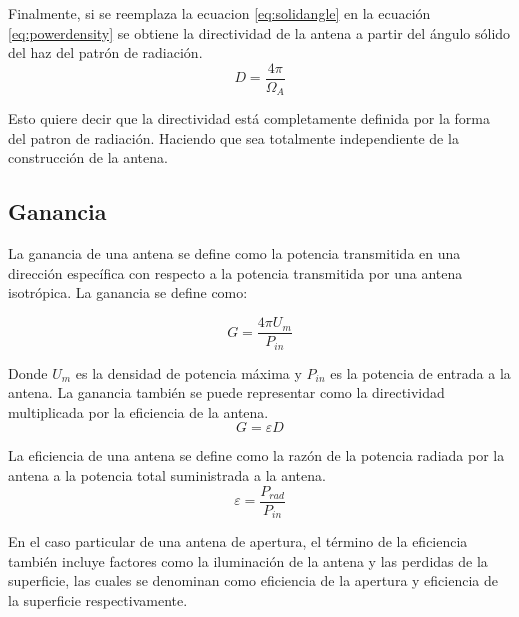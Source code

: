Finalmente, si se reemplaza la ecuacion \ref{eq:solidangle} en la ecuación \ref{eq:powerdensity} se obtiene la directividad de la antena a partir del ángulo sólido del haz del patrón de radiación.\\

\begin{equation}
    D = \frac{4\pi}{\Omega_{A}}
\end{equation}

Esto quiere decir que la directividad está completamente definida por la forma del patron de radiación. Haciendo que sea totalmente independiente de la construcción de la antena\cite{stutzman2012antenna}.\\


\subsection{Ganancia}

La ganancia de una antena se define como la potencia transmitida en una dirección específica con respecto a la potencia transmitida por una antena isotrópica. La ganancia se define como:

\begin{equation}
    G = \frac{4\pi U_{m}}{P_{in}}
\end{equation}

Donde $U_{m}$ es la densidad de potencia máxima y $P_{in}$ es la potencia de entrada a la antena. La ganancia también se puede representar como la directividad multiplicada por la eficiencia de la antena.\\

\begin{equation}
    G = \varepsilon D 
\end{equation}

La eficiencia de una antena se define como la razón de la potencia radiada por la antena a la potencia total suministrada a la antena.\\

\begin{equation}
    \varepsilon = \frac{P_{rad}}{P_{in}}
\end{equation}

En el caso particular de una antena de apertura, el término de la eficiencia también incluye factores como la iluminación de la antena y las perdidas de la superficie, las cuales se denominan como eficiencia de la apertura y eficiencia de la superficie respectivamente.\\

